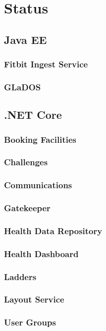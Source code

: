 \chapter{Status}

\section{Java EE}
    \subsection{Fitbit Ingest Service}
        
    \subsection{GLaDOS}
    	

\section{.NET Core}
    \subsection{Booking Facilities}
    	
    \subsection{Challenges}
    	
    \subsection{Communications}
    	
    \subsection{Gatekeeper}
    	
    \subsection{Health Data Repository}
    	
    \subsection{Health Dashboard}
    	
    \subsection{Ladders}
    	
    \subsection{Layout Service}
    	
    \subsection{User Groups}
    	